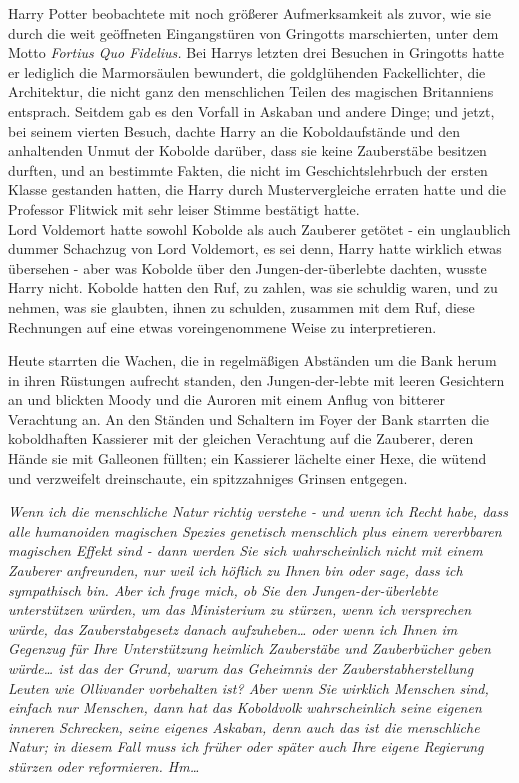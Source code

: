{Harry Potter beobachtete mit noch größerer Aufmerksamkeit als zuvor, wie sie durch die weit geöffneten Eingangstüren von Gringotts marschierten, unter dem Motto \emph{Fortius Quo Fidelius.} Bei Harrys letzten drei Besuchen in Gringotts hatte er lediglich die Marmorsäulen bewundert, die goldglühenden Fackellichter, die Architektur, die nicht ganz den menschlichen Teilen des magischen Britanniens entsprach. Seitdem gab es den Vorfall in Askaban und andere Dinge; und jetzt, bei seinem vierten Besuch, dachte Harry an die Koboldaufstände und den anhaltenden Unmut der Kobolde darüber, dass sie keine Zauberstäbe besitzen durften, und an bestimmte Fakten, die nicht im Geschichtslehrbuch der ersten Klasse gestanden hatten, die Harry durch Mustervergleiche erraten hatte und die Professor Flitwick mit sehr leiser Stimme bestätigt hatte.\\ Lord Voldemort hatte sowohl Kobolde als auch Zauberer getötet - ein unglaublich dummer Schachzug von Lord Voldemort, es sei denn, Harry hatte wirklich etwas übersehen - aber was Kobolde über den Jungen-der-überlebte dachten, wusste Harry nicht. Kobolde hatten den Ruf, zu zahlen, was sie schuldig waren, und zu nehmen, was sie glaubten, ihnen zu schulden, zusammen mit dem Ruf, diese Rechnungen auf eine etwas voreingenommene Weise zu interpretieren.

Heute starrten die Wachen, die in regelmäßigen Abständen um die Bank herum in ihren Rüstungen aufrecht standen, den Jungen-der-lebte mit leeren Gesichtern an und blickten Moody und die Auroren mit einem Anflug von bitterer Verachtung an. An den Ständen und Schaltern im Foyer der Bank starrten die koboldhaften Kassierer mit der gleichen Verachtung auf die Zauberer, deren Hände sie mit Galleonen füllten; ein Kassierer lächelte einer Hexe, die wütend und verzweifelt dreinschaute, ein spitzzahniges Grinsen entgegen.

\emph{Wenn ich die menschliche Natur richtig verstehe - und wenn ich Recht habe, dass alle humanoiden magischen Spezies genetisch menschlich plus einem vererbbaren magischen Effekt sind - dann werden Sie sich wahrscheinlich nicht mit einem Zauberer anfreunden, nur weil ich höflich zu Ihnen bin oder sage, dass ich sympathisch bin. Aber ich frage mich, ob Sie den Jungen-der-überlebte unterstützen würden, um das Ministerium zu stürzen, wenn ich versprechen würde, das Zauberstabgesetz danach aufzuheben… oder wenn ich Ihnen im Gegenzug für Ihre Unterstützung heimlich Zauberstäbe und Zauberbücher geben würde… ist das der Grund, warum das Geheimnis der Zauberstabherstellung Leuten wie Ollivander vorbehalten ist? Aber wenn Sie wirklich Menschen sind, einfach nur Menschen, dann hat das Koboldvolk wahrscheinlich seine eigenen inneren Schrecken, seine eigenes Askaban, denn auch das ist die menschliche Natur; in diesem Fall muss ich früher oder später auch Ihre eigene Regierung stürzen oder reformieren. Hm…}

}

